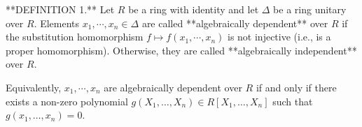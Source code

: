 **DEFINITION 1.** Let $R$ be a ring with identity and let $\Delta$ be a ring unitary over $R$. Elements $x_1, \cdots, x_n \in \Delta$ are called **algebraically dependent** over $R$ if the substitution homomorphism $f \mapsto f(x_1, \cdots, x_n)$ is not injective (i.e., is a proper homomorphism). Otherwise, they are called **algebraically independent** over $R$.

Equivalently, $x_1, \cdots, x_n$ are algebraically dependent over $R$ if and only if there exists a non-zero polynomial $g(X_1, \dots, X_n) \in R[X_1, \dots, X_n]$ such that $g(x_1, \dots, x_n) = 0$.
